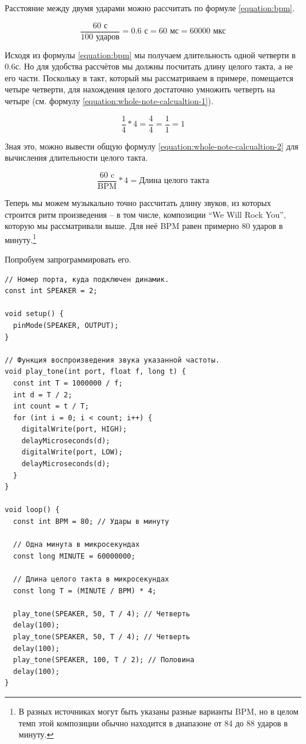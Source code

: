 \documentclass[a4paper,twoside]{book}
\begin{document}
Расстояние между двумя ударами можно рассчитать по формуле \ref{equation:bpm}.

\begin{equation}
  \label{equation:bpm}
  \frac{\mbox{60 с}}{\mbox{100 ударов}} = \mbox{0.6 с} = \mbox{60 мс} = \mbox{60000 мкс}
\end{equation}

Исходя из формулы \ref{equation:bpm} мы получаем длительность одной четверти в
0.6с. Но для удобства рассчётов мы должны посчитать длину целого такта, а не его
части. Поскольку в такт, который мы рассматриваем в примере, помещается четыре
четверти, для нахождения целого достаточно умножить четверть на четыре (см.
формулу \ref{equation:whole-note-calcualtion-1}).

\begin{equation}
  \label{equation:whole-note-calcualtion-1}
  \frac{1}{4} * 4 = \frac{4}{4} = \frac{1}{1} = 1
\end{equation}

Зная это, можно вывести общую формулу \ref{equation:whole-note-calcualtion-2}
для вычисления длительности целого такта.

\begin{equation}
  \label{equation:whole-note-calcualtion-2}
  \frac{\mbox{60 c}}{\mbox{BPM}} * 4 = \mbox{Длина целого такта}
\end{equation}

Теперь мы можем музыкально точно рассчитать длину звуков, из которых строится
ритм произведения -- в том числе, композиции ``We Will Rock You'', которую мы
рассматривали выше. Для неё BPM равен примерно 80 ударов в минуту.\footnote{В
разных источниках могут быть указаны разные варианты BPM, но в целом темп этой
композиции обычно находится в диапазоне от 84 до 88 ударов в минуту.}

Попробуем запрограммировать его.

\begin{verbatim}
// Номер порта, куда подключен динамик.
const int SPEAKER = 2;

void setup() {
  pinMode(SPEAKER, OUTPUT);
}

// Функция воспроизведения звука указанной частоты.
void play_tone(int port, float f, long t) {
  const int T = 1000000 / f;
  int d = T / 2;
  int count = t / T;
  for (int i = 0; i < count; i++) {
    digitalWrite(port, HIGH);
    delayMicroseconds(d);
    digitalWrite(port, LOW);
    delayMicroseconds(d);
  }
}

void loop() {
  const int BPM = 80; // Удары в минуту

  // Одна минута в микросекундах
  const long MINUTE = 60000000;

  // Длина целого такта в микросекундах
  const long T = (MINUTE / BPM) * 4;

  play_tone(SPEAKER, 50, T / 4); // Четверть
  delay(100);
  play_tone(SPEAKER, 50, T / 4); // Четверть
  delay(100);
  play_tone(SPEAKER, 100, T / 2); // Половина
  delay(100);
}
\end{verbatim}
\end{document}
